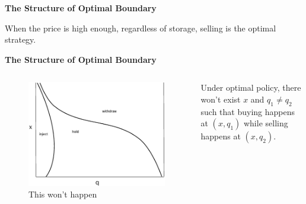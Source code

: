 \documentclass{beamer}
\begin{document}
\begin{frame}
{\bf The Structure of Optimal Boundary}

\begin{theorem}
When the price is high enough, regardless of storage, selling is the optimal strategy.
\end{theorem}


\end{frame}



\begin{frame}
{\bf The Structure of Optimal Boundary}

\begin{columns}
  \begin{figure}[hbt]
  \includegraphics[scale = 0.25]{wonthappen.eps}
  \caption{This won't happen}
  \end{figure}
   \begin{theorem}
    Under optimal policy, there won't exist $x$ and $q_1 \neq q_2$ such that buying happens at $(x,q_1)$ while selling happens at $(x,q_2)$.
    \end{theorem}
\end{columns}


\end{frame}
\end{document}
